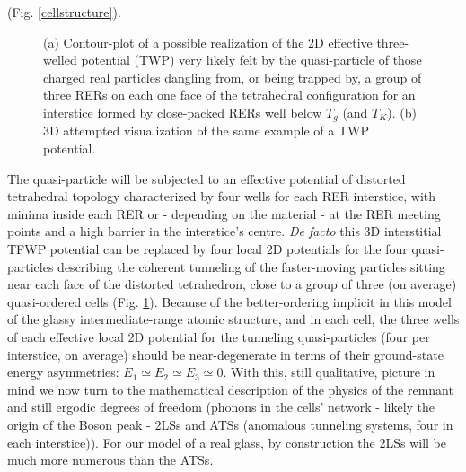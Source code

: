 \documentclass[10pt]{article}
\begin{document}
(Fig. \ref{cellstructure}). 
\begin{figure}[h]
\centering
\vskip -3mm
\caption[2]{ (a) Contour-plot of a possible realization of the 2D effective 
three-welled potential (TWP) very likely felt by the quasi-particle of those 
charged real particles dangling from, or being trapped by, a group of three 
RERs on each one face of the tetrahedral configuration for an interstice 
formed by close-packed RERs well below $T_g$ (and $T_K$). (b) 3D 
attempted visualization of the same example of a TWP potential. }
\label{threewells}
\end{figure}
The quasi-particle will be subjected to an effective potential of distorted
tetrahedral topology characterized by four wells for each RER interstice, with
minima inside each RER or - depending on the material - at the RER meeting
points and a high barrier in the interstice's centre. {\it De facto} this 3D interstitial
TFWP potential can be replaced by four local 2D potentials for the four 
quasi-particles describing the coherent tunneling of the faster-moving 
particles sitting near each face of the distorted tetrahedron, close to a group of 
three (on average) quasi-ordered cells (Fig. \ref{threewells}). Because of the 
better-ordering implicit in this model of the glassy intermediate-range atomic
structure, and in each cell, the three wells of each effective local 2D 
potential for the tunneling quasi-particles (four per interstice, on average)
should be near-degenerate in terms of their ground-state energy asymmetries:
$E_1 \simeq E_2 \simeq E_3 \simeq 0$.
With this, still qualitative, picture in mind we now turn to the mathematical 
description of the physics of the remnant and still ergodic degrees of freedom
(phonons in the cells' network - likely the origin of the Boson peak - 2LSs and 
ATSs (anomalous tunneling systems, four in each interstice)). For our model 
of a real glass, by construction the 2LSs will be much more numerous than the 
ATSs.   
\end{document}
